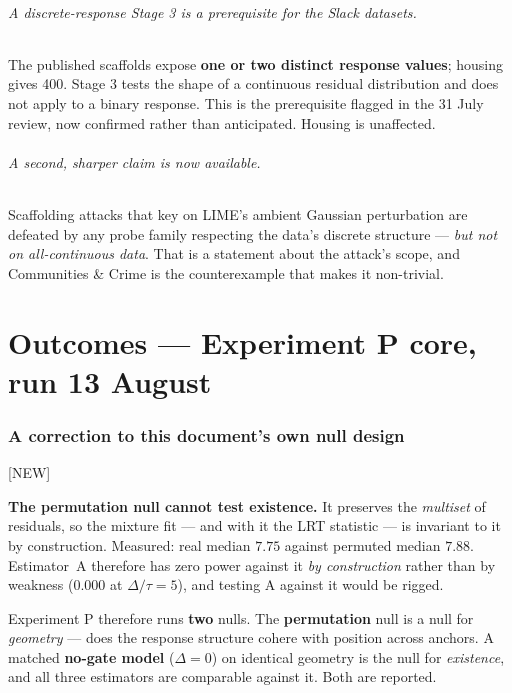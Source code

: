 \documentclass[11pt]{article}
\newcommand{\provtag}[2]{{\footnotesize\sffamily\textcolor{#1}{[#2]}}}
\newcommand{\NEWT}{\provtag{newmag}{NEW}}
\begin{document}
\paragraph{A discrete-response Stage 3 is a prerequisite for the Slack datasets.} The published
scaffolds expose \textbf{one or two distinct response values}; housing gives 400. Stage 3 tests
the shape of a continuous residual distribution and does not apply to a binary response. This is
the prerequisite flagged in the 31 July review, now confirmed rather than anticipated. Housing is
unaffected.

\paragraph{A second, sharper claim is now available.} Scaffolding attacks that key on LIME's
ambient Gaussian perturbation are defeated by any probe family respecting the data's discrete
structure --- \emph{but not on all-continuous data}. That is a statement about the attack's
scope, and Communities \& Crime is the counterexample that makes it non-trivial.

\part{Outcomes --- Experiment P core, run 13 August}

\section{A correction to this document's own null design} \NEWT

\begin{limitbox}
\noindent\textbf{The permutation null cannot test existence.} It preserves the \emph{multiset}
of residuals, so the mixture fit --- and with it the LRT statistic --- is invariant to it by
construction. Measured: real median $7.75$ against permuted median $7.88$. Estimator~A therefore
has zero power against it \emph{by construction} rather than by weakness ($0.000$ at
$\Delta/\tau = 5$), and testing A against it would be rigged.
\end{limitbox}

\noindent Experiment P therefore runs \textbf{two} nulls. The \textbf{permutation} null is a null
for \emph{geometry} --- does the response structure cohere with position across anchors. A matched
\textbf{no-gate model} ($\Delta = 0$) on identical geometry is the null for \emph{existence}, and
all three estimators are comparable against it. Both are reported.
\end{document}
